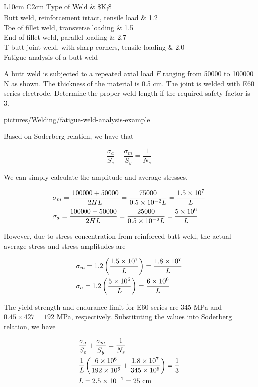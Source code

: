 \documentclass[a4paper,openany,nobib]{tufte-book}
\begin{document}
{{ L10cm C2cm Type of Weld \& \$K\textsubscript{f}\$\\
Butt weld, reinforcement intact, tensile load \& 1.2\\
Toe of fillet weld, transverse loading \& 1.5\\
End of fillet weld, parallel loading \& 2.7\\
T-butt joint weld, with sharp corners, tensile loading \& 2.0\\

Fatigue analysis of a butt weld

A butt weld is subjected to a repeated axial load \(F\) ranging from 50000
to 100000 N as shown. The thickness of the material is 0.5 cm. The joint
is welded with E60 series electrode. Determine the proper weld length if
the required safety factor is 3.


\url{pictures/Welding/fatigue-weld-analysis-example}

Based on Soderberg relation, we have that

$$\frac{\sigma _a}{S_e} + \frac{\sigma _m}{S_y} = \frac{1}{N_s}$$

We can simply calculate the amplitude and average stresses.

$$\begin{gathered}
      \sigma_m = \frac{100000 + 50000}{2HL} = \frac{75000}{0.5 \times 10^{-2}L} = \frac{1.5 \times 10^7}{L} \hfill \\
      \sigma_a = \frac{100000 - 50000}{2HL} = \frac{25000}{0.5 \times 10^{-2}L} = \frac{5 \times 10^6}{L} \hfill \\ 
    \end{gathered}$$

However, due to stress concentration from reinforced butt weld, the
actual average stress and stress amplitudes are

$$\begin{gathered}
      \sigma_m = 1.2\left( \frac{1.5 \times 10^7}{L} \right) = \frac{1.8 \times 10^7}{L} \hfill \\
      \sigma_a = 1.2\left( \frac{5 \times 10^6}{L} \right) = \frac{6 \times 10^6}{L} \hfill \\ 
    \end{gathered}$$

The yield strength and endurance limit for E60 series are 345 MPa and
\(0.45 \times 427 = 192\) MPa, respectively. Substituting the values into
Soderberg relation, we have

$$\begin{gathered}
      \frac{\sigma_a}{S_e} + \frac{\sigma_m}{S_y} = \frac{1}{N_s} \hfill \\
      {1 \over L} \left( \frac{6 \times 10^6}{192 \times 10^6} + \frac{1.8 \times 10^7}{345 \times 10^6} \right) = \frac{1}{3} \hfill \\
      L = 2.5 \times {10^{-1}} = 25\text{ cm} \hfill \\ 
    \end{gathered}$$

}}
\end{document}
